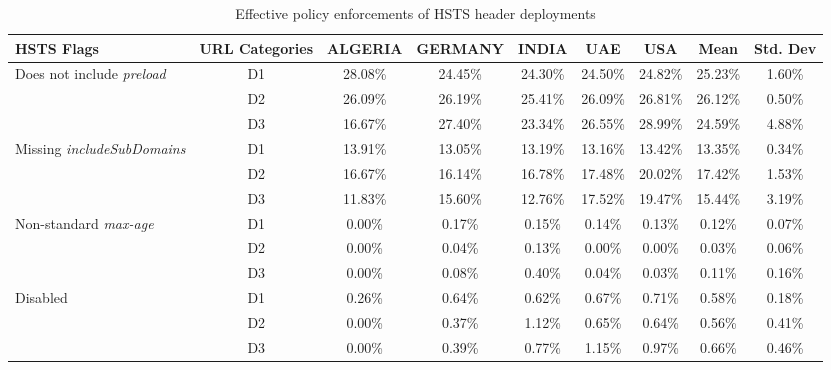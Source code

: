 \begin{table}[!ht]
    \centering
    \footnotesize
    \caption{Effective policy enforcements of HSTS header deployments}
    \label{tab:sec-lot-hsts}
    \begin{tabular}{l|c|c|c|c|c|c|c|c}
    \toprule
        HSTS Flags & URL Categories & ALGERIA & GERMANY & INDIA & UAE & USA & Mean & Std. Dev \\ \midrule
        \multirow{3}{*}{Does not include \textit{preload}} & D1 & 28.08\% & 24.45\% & 24.30\% & 24.50\% & 24.82\% & 25.23\% & 1.60\% \\
        ~ & D2 & 26.09\% & 26.19\% & 25.41\% & 26.09\% & 26.81\% & 26.12\% & 0.50\% \\
        ~ & D3 & 16.67\% & 27.40\% & 23.34\% & 26.55\% & 28.99\% & 24.59\% & 4.88\% \\ \hline
        \multirow{3}{*}{Missing \textit{includeSubDomains}} & D1 & 13.91\% & 13.05\% & 13.19\% & 13.16\% & 13.42\% & 13.35\% & 0.34\% \\
        ~ & D2 & 16.67\% & 16.14\% & 16.78\% & 17.48\% & 20.02\% & 17.42\% & 1.53\% \\
        ~ & D3 & 11.83\% & 15.60\% & 12.76\% & 17.52\% & 19.47\% & 15.44\% & 3.19\% \\ \hline
        \multirow{3}{*}{Non-standard \textit{max-age}} & D1 & 0.00\% & 0.17\% & 0.15\% & 0.14\% & 0.13\% & 0.12\% & 0.07\% \\
        ~ & D2 & 0.00\% & 0.04\% & 0.13\% & 0.00\% & 0.00\% & 0.03\% & 0.06\% \\
        ~ & D3 & 0.00\% & 0.08\% & 0.40\% & 0.04\% & 0.03\% & 0.11\% & 0.16\% \\ \hline
        \multirow{3}{*}{Disabled} & D1 & 0.26\% & 0.64\% & 0.62\% & 0.67\% & 0.71\% & 0.58\% & 0.18\% \\
        ~ & D2 & 0.00\% & 0.37\% & 1.12\% & 0.65\% & 0.64\% & 0.56\% & 0.41\% \\
        ~ & D3 & 0.00\% & 0.39\% & 0.77\% & 1.15\% & 0.97\% & 0.66\% & 0.46\% \\ \bottomrule
    \end{tabular}
\end{table}

